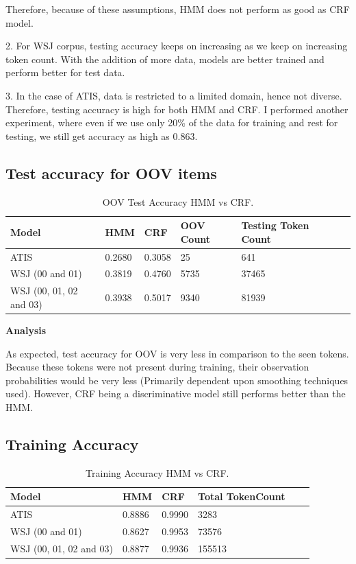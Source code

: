 Therefore, because of these assumptions, HMM does not perform as good as CRF model.

2. For WSJ corpus, testing accuracy keeps on increasing as we keep on increasing token count. With the addition of more data, models are better trained and perform better for test data. 

3. In the case of ATIS, data is restricted to a limited domain, hence not diverse. Therefore, testing accuracy is high for both HMM and CRF. I performed another experiment, where even if we use only 20\% of the data for training and rest for testing, we still get accuracy as high as 0.863.

\subsection {Test accuracy for OOV items}
\begin{center}	
	\begin{table}[ht]
  	\centering
   	\begin{tabular}{| l | l | l | l | l | l | l |}
    	\hline
        Model & HMM & CRF & OOV Count & Testing Token Count \\ \hline
        ATIS & 0.2680 & 0.3058 &  25 & 641 \\ \hline
        WSJ (00 and 01) & 0.3819 & 0.4760 & 5735 & 37465 \\ \hline
	WSJ (00, 01, 02 and 03) & 0.3938 & 0.5017 & 9340 & 81939 \\ \hline
    	\end{tabular}
    	\caption{OOV Test Accuracy HMM vs CRF. }
    	\end{table}%
\end{center}

{\bfseries Analysis}

As expected, test accuracy for OOV is very less in comparison to the seen tokens. Because these tokens were not present during training, their observation probabilities would be very less (Primarily dependent upon smoothing techniques used). However, CRF being a discriminative model still performs better than the HMM.

\subsection {Training Accuracy}

\begin{center}	
	\begin{table}[ht]
  	\centering
   	\begin{tabular}{| l | l | l | l | l | l |}
    	\hline
        Model & HMM & CRF & Total TokenCount \\ \hline
        ATIS & 0.8886 & 0.9990 &  3283 \\ \hline
        WSJ (00 and 01) & 0.8627 & 0.9953 & 73576 \\ \hline
	WSJ (00, 01, 02 and 03) & 0.8877 & 0.9936 & 155513 \\ \hline
    	\end{tabular}
    	\caption{Training Accuracy HMM vs CRF. }
    	\end{table}%
\end{center}

